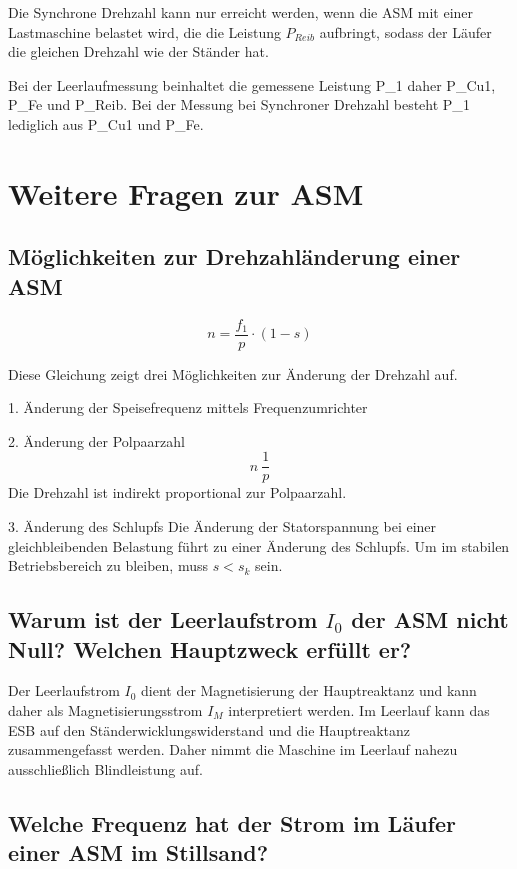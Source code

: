 \documentclass[conference]{IEEEtran}
\begin{document}
Die Synchrone Drehzahl kann nur erreicht werden, wenn die ASM mit einer Lastmaschine belastet wird,
die die Leistung $P_{Reib}$ aufbringt, sodass der Läufer die gleichen Drehzahl wie der Ständer hat.

Bei der Leerlaufmessung beinhaltet die gemessene Leistung P_{1} daher P_{Cu1}, P_{Fe} und P_{Reib}.
Bei der Messung bei Synchroner Drehzahl besteht P_{1} lediglich aus P_{Cu1} und P_{Fe}.


\section{Weitere Fragen zur ASM}

\subsection{Möglichkeiten zur Drehzahländerung einer ASM}

\begin{equation}
  n = \frac{f_{1}}{p} \cdot (1-s)
\end{equation}

Diese Gleichung zeigt drei Möglichkeiten zur Änderung der Drehzahl auf.

1. Änderung der Speisefrequenz mittels Frequenzumrichter

2. Änderung der Polpaarzahl
\begin{equation}
    n ~ \frac{1}{p}
\end{equation}
Die Drehzahl ist indirekt proportional zur Polpaarzahl.

3. Änderung des Schlupfs
Die Änderung der Statorspannung bei einer gleichbleibenden Belastung führt zu einer Änderung
des Schlupfs. Um im stabilen Betriebsbereich zu bleiben, muss $s<s_{k}$ sein. 

\subsection{Warum ist der Leerlaufstrom $I_{0}$ der ASM nicht Null? Welchen Hauptzweck erfüllt er?}

Der Leerlaufstrom $I_{0}$ dient der Magnetisierung der Hauptreaktanz und kann daher als
Magnetisierungsstrom $I_{M}$ interpretiert werden. Im Leerlauf kann das ESB auf den 
Ständerwicklungswiderstand und die Hauptreaktanz zusammengefasst werden. Daher nimmt die Maschine 
im Leerlauf nahezu ausschließlich Blindleistung auf.

\subsection{Welche Frequenz hat der Strom im Läufer einer ASM im Stillsand?}
\end{document}
